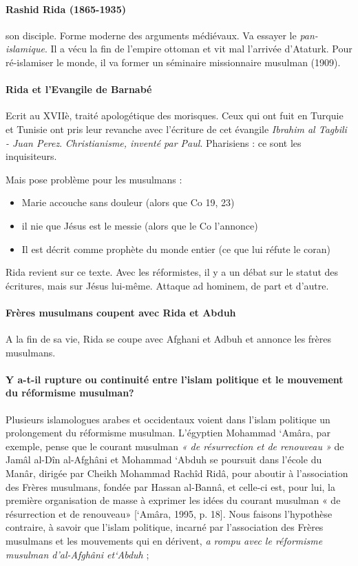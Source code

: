 \paragraph{Rashid Rida (1865-1935)} son disciple. Forme moderne des arguments médiévaux. Va essayer le \textit{pan-islamique}. Il a  vécu la fin de l'empire ottoman et vit mal l'arrivée d'Ataturk.
Pour ré-islamiser le monde, il va former un séminaire missionnaire musulman (1909).

\paragraph{Rida et l'Evangile de Barnabé} Ecrit au XVIIè, traité apologétique des morisques. Ceux qui ont fuit en Turquie et Tunisie ont pris leur revanche avec l'écriture de cet évangile \textit{Ibrahim al Tagbili - Juan Perez}. \textit{Christianisme, inventé par Paul}.  Pharisiens : ce sont les inquisiteurs. 

Mais pose problème pour les musulmans : 
\begin{itemize}
    \item Marie accouche sans douleur (alors que Co 19, 23)
    \item il nie que Jésus est le messie (alors que le Co l'annonce)
    \item Il est décrit comme prophète du monde entier (ce que lui réfute le coran)
\end{itemize}
Rida revient sur ce texte.  Avec les réformistes, il y a un débat sur le statut des écritures, mais sur Jésus lui-même. Attaque ad hominem, de part et d'autre.  

\paragraph{Frères musulmans coupent avec Rida et Abduh} A la fin de sa vie, Rida se coupe avec Afghani et Adbuh et annonce les frères musulmans. 
\paragraph{Y a-t-il  rupture  ou  continuité  entre  l’islam  politique  et  le mouvement du réformisme musulman?} Plusieurs islamologues arabes et  occidentaux  voient  dans  l’islam  politique  un  prolongement  du réformisme  musulman.  L’égyptien  Mohammad  ‘Amâra,  par  exemple, pense que le courant musulman \textit{« de résurrection et de renouveau »} de Jamâl  al-Dîn  al-Afghâni  et  Mohammad  ‘Abduh  se  poursuit  dans l’école  du  Manâr,  dirigée  par  Cheikh  Mohammad  Rachîd  Ridâ,  pour aboutir  à  l’association  des  Frères  musulmans,  fondée  par  Hassan  al-Bannâ,  et  celle-ci  est,  pour  lui,  la  première  organisation  de  masse  à exprimer  les  idées  du  courant  musulman  « de  résurrection  et  de renouveau» [‘Amâra, 1995, p.  18]. Nous  faisons  l’hypothèse  contraire,  à  savoir  que  l’islam  politique, incarné par l’association des Frères musulmans et les mouvements qui en  dérivent,  \textit{a  rompu  avec  le  réformisme  musulman  d’al-Afghâni  et‘Abduh }; 

